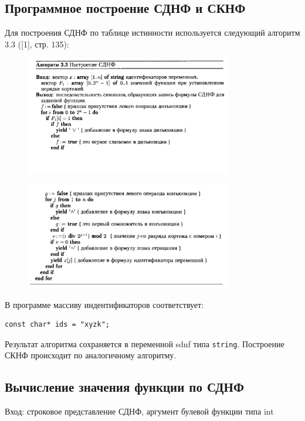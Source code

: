 \documentclass[a4paper]{article}
\theoremstyle{plain}
\theoremstyle{definition*}
\theoremstyle{remark}
\begin{document}
\subsection{Программное построение СДНФ и СКНФ}
Для построения СДНФ по таблице истинности используется следующий 
алгоритм 3.3 ([1], стр. 135): 
\begin{figure}[htpb]
    \centering
    \includegraphics[width=0.8\textwidth]{pics/SDNF1}
\end{figure}
\vspace{-2.3 cm}

\begin{figure}[htpb]
    \centering
    \includegraphics[width=0.8\textwidth]{pics/SDNF2}
\end{figure}

В программе массиву индентификаторов соответствует: 
\begin{lstlisting}
const char* ids = "xyzk";
\end{lstlisting}

Результат алгоритма сохраняется в переменной sdnf типа \lstinline{string}.
Построение СКНФ происходит по аналогичному алгоритму. 
\newpage
\subsection{Вычисление значения функции по СДНФ}
Вход: строковое представление СДНФ, аргумент булевой функции типа int
\end{document}
